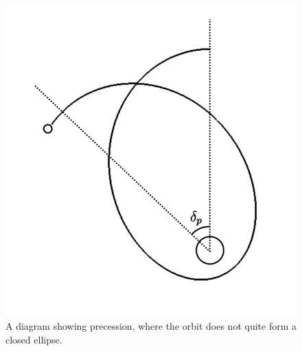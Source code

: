 \documentclass[12pt]{article}
\begin{document}
\pagebreak



\begin{figure} 
\centering
\label{fig4}
  \includegraphics[width = 6 in]{precession.png}
  \caption{ A diagram showing precession, where the orbit does not quite form a closed ellipse.
}
\end{figure}
\end{document}
